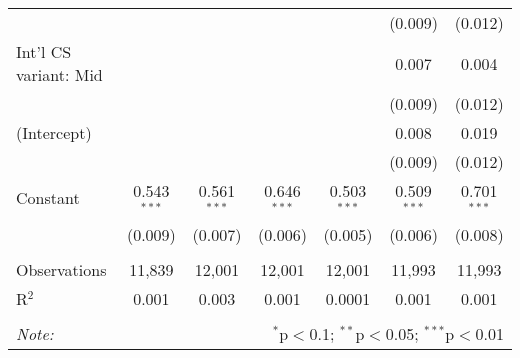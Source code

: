 \begin{tabular}{@{\extracolsep{5pt}}lcccccc}
  &  &  &  &  & (0.009) & (0.012) \\ 
  Int'l CS variant: Mid &  &  &  &  & 0.007 & 0.004 \\ 
  &  &  &  &  & (0.009) & (0.012) \\ 
  (Intercept) &  &  &  &  & 0.008 & 0.019 \\ 
  &  &  &  &  & (0.009) & (0.012) \\ 
  Constant & 0.543$^{***}$ & 0.561$^{***}$ & 0.646$^{***}$ & 0.503$^{***}$ & 0.509$^{***}$ & 0.701$^{***}$ \\ 
  & (0.009) & (0.007) & (0.006) & (0.005) & (0.006) & (0.008) \\ 
 \hline \\[-1.8ex] 
Observations & 11,839 & 12,001 & 12,001 & 12,001 & 11,993 & 11,993 \\ 
R$^{2}$ & 0.001 & 0.003 & 0.001 & 0.0001 & 0.001 & 0.001 \\ 
\hline 
\hline \\[-1.8ex] 
\textit{Note:}  & \multicolumn{6}{r}{$^{*}$p$<$0.1; $^{**}$p$<$0.05; $^{***}$p$<$0.01} \\ 
\end{tabular} 
